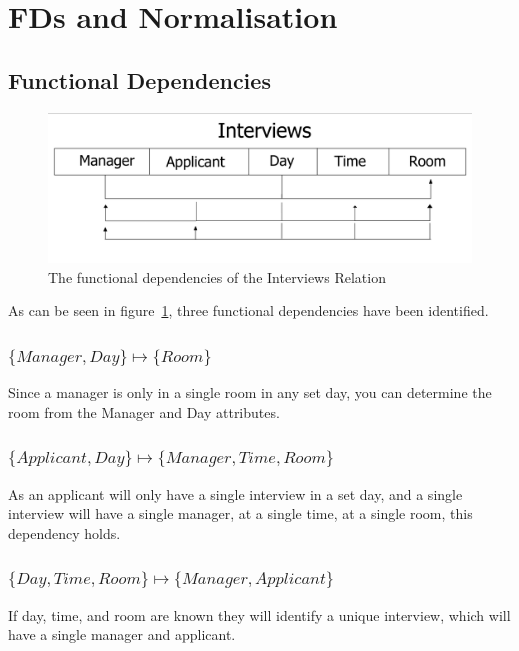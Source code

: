 \documentclass[12pt]{article}
\begin{document}
\section {FDs and Normalisation}\label{sec:fds-and-normalisation}
\subsection {Functional Dependencies}\label{subsec:functional-dependencies}

\begin {figure}[h]
\includegraphics [width=\textwidth]{FD}
\caption { The functional dependencies of the Interviews Relation	}
\label{fig:fd1}
\end {figure}

As can be seen in figure~\ref{fig:fd1}, three functional dependencies have been identified.

\subsubsection {\(\{Manager, Day\} \mapsto \{Room\}\)}
Since a manager is only in a single room in any set day, you can determine the room from the Manager and Day attributes.

\subsubsection {\(\{Applicant, Day\} \mapsto \{Manager, Time, Room\}\)}
As an applicant will only have a single interview in a set day, and a single interview will have a single manager, at a single time, at a single room, this dependency holds.

\subsubsection {\(\{Day, Time, Room\} \mapsto \{Manager, Applicant\}\)}
If day, time, and room are known they will identify a unique interview, which will have a single manager and applicant.
\end{document}
